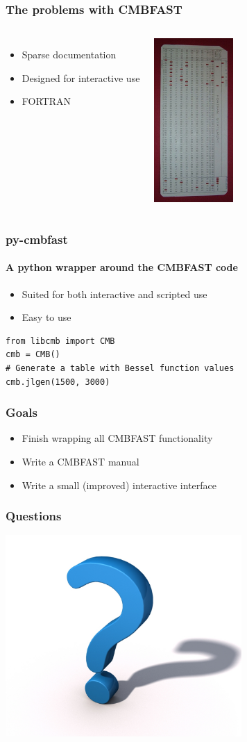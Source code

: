 \documentclass{beamer}
\begin{document}
	\begin{frame}
		\frametitle{The problems with CMBFAST}
		\begin{columns}[c]
			\begin{itemize}
				\item Sparse documentation
				\item Designed for interactive use
				\item FORTRAN
			\end{itemize}
			\includegraphics[width=30mm]{punch_card.jpg}
		\end{columns}
	\end{frame}
	
	\begin{frame}[fragile]
		\frametitle{py-cmbfast}
		\framesubtitle{A python wrapper around the CMBFAST code}
		\begin{itemize}
			\item Suited for both interactive and scripted use
			\item Easy to use
		\end{itemize}
		\begin{verbatim}
from libcmb import CMB
cmb = CMB()
# Generate a table with Bessel function values
cmb.jlgen(1500, 3000)
		\end{verbatim}
	\end{frame}

	\begin{frame}
		\frametitle{Goals}
		\begin{itemize}
			\item Finish wrapping all CMBFAST functionality
			\item Write a CMBFAST manual
			\item Write a small (improved) interactive interface
		\end{itemize}
	\end{frame}

	\begin{frame}
		\frametitle{Questions}
		\begin{center}
			\includegraphics[width=90mm]{question.png}
		\end{center}
	\end{frame}
\end{document}
